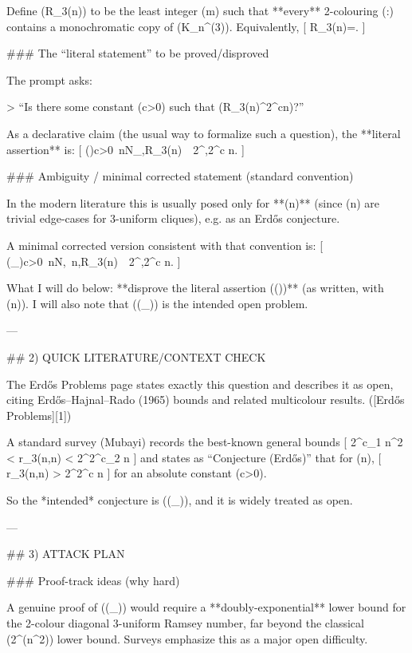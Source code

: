 Define (R_3(n)) to be the least integer (m) such that **every** 2-colouring (\chi:) contains a monochromatic copy of (K_n^{(3)}). Equivalently,
[
R_3(n)=\min{}.
]

### The “literal statement” to be proved/disproved

The prompt asks:

> “Is there some constant (c>0) such that (R_3(n)^{2^{cn}})?”

As a declarative claim (the usual way to formalize such a question), the **literal assertion** is:
[
(\star)\qquad \exists c>0\ \forall n\in\mathbb N_{},\quad R_3(n)\ \ge\ 2^{,2^{c n}}.
]

### Ambiguity / minimal corrected statement (standard convention)

In the modern literature this is usually posed only for **(n)** (since (n) are trivial edge-cases for 3-uniform cliques), e.g. as an Erdős conjecture. 

A minimal corrected version consistent with that convention is:
[
(\star_{})\qquad \exists c>0\ \forall n\in\mathbb N,\ n,\quad R_3(n)\ \ge\ 2^{,2^{c n}}.
]

What I will do below: **disprove the literal assertion ((\star))** (as written, with (n)). I will also note that ((\star_{})) is the intended open problem.

---

## 2) QUICK LITERATURE/CONTEXT CHECK

The Erdős Problems page states exactly this question and describes it as open, citing Erdős–Hajnal–Rado (1965) bounds and related multicolour results. ([Erdős Problems][1])

A standard survey (Mubayi) records the best-known general bounds
[
2^{c_1 n^2} < r_3(n,n) < 2^{2^{c_2 n}}
]
and states as “Conjecture (Erdős)” that for (n),
[
r_3(n,n) > 2^{2^{c n}}
]
for an absolute constant (c>0). 

So the *intended* conjecture is ((\star_{})), and it is widely treated as open. 

---

## 3) ATTACK PLAN

### Proof-track ideas (why hard)

A genuine proof of ((\star_{})) would require a **doubly-exponential** lower bound for the 2-colour diagonal 3-uniform Ramsey number, far beyond the classical (2^{\Theta(n^2)}) lower bound. Surveys emphasize this as a major open difficulty. 

